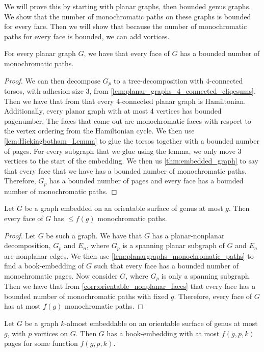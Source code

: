 We will prove this by starting with planar graphs, then bounded genus graphs. We show that the number of monochromatic paths on these graphs is bounded for every face. Then we will show that because the number of monochromatic paths for every face is bounded, we can add vortices.

\begin{lemma}\label{lem:planargraphs_monochromatic_paths}
	For every planar graph $G$, we have that every face of $G$ has a bounded number of monochromatic paths.
\end{lemma}
\begin{proof}
	We can then decompose $G_p$ to a tree-decomposition with 4-connected torsos, with adhesion size 3, from \cref{lem:planar_graphs_4_connected_cliqesums}. Then we have that from \textcite{tutteTheoremPlanarGraphs1956} that every 4-connected planar graph is Hamiltonian. Additionally, every planar graph with at most 4 vertices has bounded pagenumber.
	The faces that come out are monochromatic faces with respect to the vertex ordering from the Hamiltonian cycle.
	We then use \cref{lem:Hickingbotham_Lemma} to glue the torsos together with a bounded number of pages. For every subgraph that we glue using the lemma, we only move 3 vertices to the start of the embedding. We then us \cref{thm:embedded_graph} to say that every face that we have has a bounded number of monochromatic paths.
	Therefore, $G_p$ has a bounded number of pages and every face has a bounded number of monochromatic paths.
\end{proof}


\begin{lemma}\label{lem:orientablesurfaces_monochromatic_edges}
	Let $G$ be a graph embedded on an orientable surface of genus at most $g$. Then every face of $G$ has $ \leq f(g)$ monochromatic paths.
\end{lemma}
\begin{proof}
	Let $G$ be such a graph. We have that $G$ has a planar-nonplanar decomposition, $G_p$ and $E_n$, where $G_p$ is a spanning planar subgraph of $G$ and $E_n$ are nonplanar edges. We then use \cref{lem:planargraphs_monochromatic_paths} to find a book-embedding of $G$ such that every face has a bounded number of monochromatic pages.
	Now consider $G$, where $G_p$ is only a spanning subgraph. Then we have that from \cref{corr:orientable_nonplanar_faces} that every face has a bounded number of monochromatic paths with fixed $g$. Therefore, every face of $G$ has at most $f(g)$ monochromatic paths.
\end{proof}
\begin{lemma}\label{lem:orientablesurfaces_almostembeddable}
	Let $G$ be a graph $k$-almost embeddable on an orientable surface of genus at most $g$, with $p$ vortices on $G$. Then $G$ has a book-embedding with at most $f(g, p, k)$ pages for some function $f(g, p, k)$.
\end{lemma}

